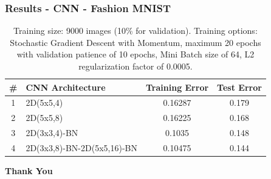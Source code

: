 \documentclass{beamer}
\begin{document}
\begin{frame}
\frametitle{Results - CNN - Fashion MNIST}
\begin{table}[hbt]
  \begin{tabular}{|c|l|c|c|}
  	\hline
    \# & CNN Architecture & Training Error & Test Error\\
    \hline
    \hline
       
    1 & 2D(5x5,4)   &             0.16287    &  0.179     \\
    2 & 2D(5x5,8)   &            0.16225     & 0.168     \\
   3 & 2D(3x3,4)-BN   &           0.1035      &0.148   \\  
    4 & 2D(3x3,8)-BN-2D(5x5,16)-BN    &           0.10475      &0.144  \\
    \hline
  \end{tabular}
  \vspace{2em}
  \caption{{Training size: 9000 images (10\% for validation). Training options: Stochastic Gradient Descent with Momentum, maximum 20 epochs with validation patience of 10 epochs, Mini Batch size of 64, L2 regularization factor of 0.0005.}}
\end{table}
\end{frame}

\begin{frame}[standout]
	\centering
	\textbf{Thank You}
\end{frame}
\end{document}
